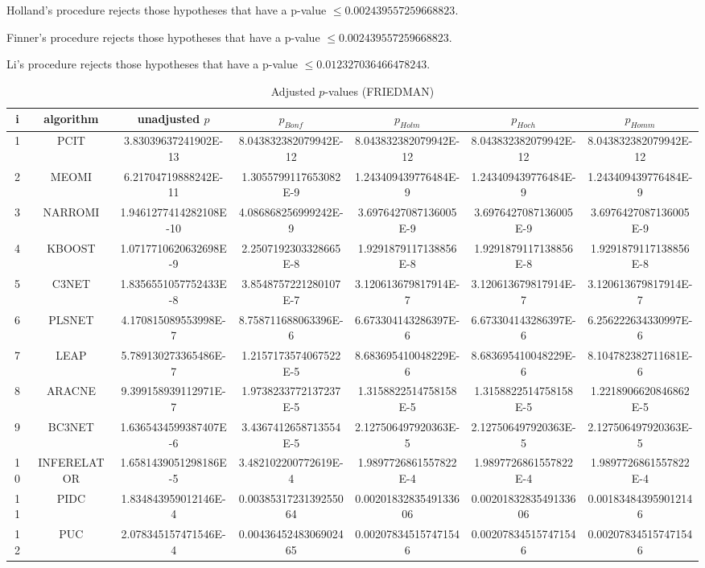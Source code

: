 \documentclass[a4paper,10pt]{article}
\begin{document}
\begin{landscape}
Holland's procedure rejects those hypotheses that have a p-value $\le0.002439557259668823$.


Finner's procedure rejects those hypotheses that have a p-value $\le0.002439557259668823$.


Li's procedure rejects those hypotheses that have a p-value $\le0.012327036466478243$.



\newpage

\begin{table}[!htp]
\centering\scriptsize
\caption{Adjusted $p$-values (FRIEDMAN)}
\begin{tabular}{ccccccc}
i&algorithm&unadjusted $p$&$p_{Bonf}$&$p_{Holm}$&$p_{Hoch}$&$p_{Homm}$\\
\hline
1&PCIT&3.83039637241902E-13&8.043832382079942E-12&8.043832382079942E-12&8.043832382079942E-12&8.043832382079942E-12\\
2&MEOMI&6.21704719888242E-11&1.3055799117653082E-9&1.243409439776484E-9&1.243409439776484E-9&1.243409439776484E-9\\
3&NARROMI&1.9461277414282108E-10&4.086868256999242E-9&3.6976427087136005E-9&3.6976427087136005E-9&3.6976427087136005E-9\\
4&KBOOST&1.0717710620632698E-9&2.2507192303328665E-8&1.9291879117138856E-8&1.9291879117138856E-8&1.9291879117138856E-8\\
5&C3NET&1.8356551057752433E-8&3.8548757221280107E-7&3.120613679817914E-7&3.120613679817914E-7&3.120613679817914E-7\\
6&PLSNET&4.170815089553998E-7&8.758711688063396E-6&6.673304143286397E-6&6.673304143286397E-6&6.256222634330997E-6\\
7&LEAP&5.789130273365486E-7&1.2157173574067522E-5&8.683695410048229E-6&8.683695410048229E-6&8.104782382711681E-6\\
8&ARACNE&9.399158939112971E-7&1.9738233772137237E-5&1.3158822514758158E-5&1.3158822514758158E-5&1.2218906620846862E-5\\
9&BC3NET&1.6365434599387407E-6&3.4367412658713554E-5&2.127506497920363E-5&2.127506497920363E-5&2.127506497920363E-5\\
10&INFERELATOR&1.6581439051298186E-5&3.482102200772619E-4&1.9897726861557822E-4&1.9897726861557822E-4&1.9897726861557822E-4\\
11&PIDC&1.834843959012146E-4&0.0038531723139255064&0.0020183283549133606&0.0020183283549133606&0.001834843959012146\\
12&PUC&2.078345157471546E-4&0.0043645248306902465&0.002078345157471546&0.002078345157471546&0.002078345157471546\\

\end{tabular}
\end{table}
\end{landscape}
\end{document}
